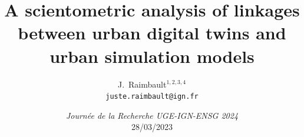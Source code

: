 \documentclass[english,11pt]{beamer}
\begin{document}
\title{A scientometric analysis of linkages between urban digital twins and urban simulation models}

\author{J.~Raimbault$^{1,2,3,4}$\\
\texttt{juste.raimbault@ign.fr}
}




\date{\textit{Journ{\'e}e de la Recherche UGE-IGN-ENSG 2024}\\
28/03/2023
}










\end{document}
